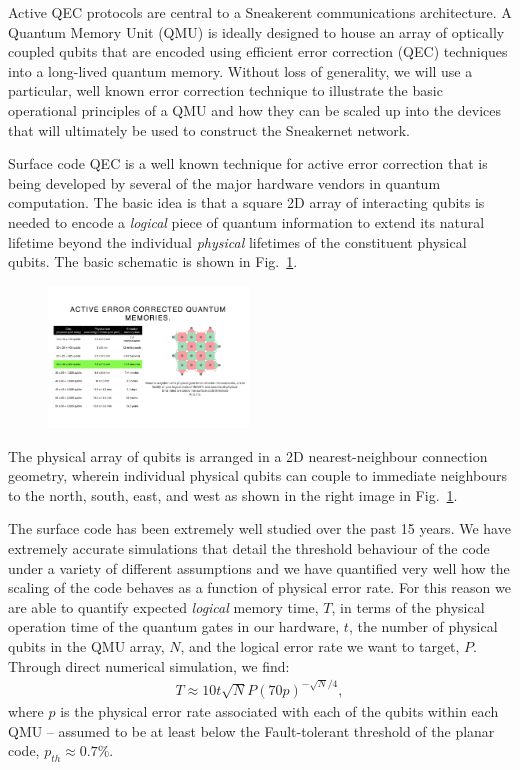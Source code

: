 \documentclass[twocolumn, aps, rmp, amsmath, amssymb, nofootinbib, superscriptaddress, longbibliography, floatfix, table-of-contents, eqsecnum]{revtex4-2}
\begin{document}
Active QEC protocols are central to a Sneakerent communications architecture. A Quantum Memory Unit (QMU) is ideally designed to house an array of optically coupled qubits that are encoded using efficient error correction (QEC) techniques into a long-lived quantum memory. Without loss of generality, we will use a particular, well known error correction technique to illustrate the basic operational principles of a QMU and how they can be scaled up into the devices that will ultimately be used to construct the Sneakernet network.

Surface code QEC is a well known technique for active error correction that is being developed by several of the major hardware vendors in quantum computation. The basic idea is that a square 2D array of interacting qubits is needed to encode a \textit{logical} piece of quantum information to extend its natural lifetime beyond the individual \textit{physical} lifetimes of the constituent physical qubits. The basic schematic is shown in Fig.~\ref{fig:array}. 

\begin{figure}[htbp!]
	\includegraphics[clip=true, width=0.475\textwidth]{array}
	\caption{} \label{fig:array}
\end{figure}

The physical array of qubits is arranged in a 2D nearest-neighbour connection geometry, wherein individual physical qubits can couple to immediate neighbours to the north, south, east, and west as shown in the right image in Fig.~\ref{fig:array}. 

The surface code has been extremely well studied over the past 15 years. We have extremely accurate simulations that detail the threshold behaviour of the code under a variety of different assumptions and we have quantified very well how the scaling of the code behaves as a function of physical error rate. For this reason we are able to quantify expected \textit{logical} memory time, $T$, in terms of the physical operation time of the quantum gates in our hardware, $t$, the number of physical qubits in the QMU array, $N$, and the logical error rate we want to target, $P$. Through direct numerical simulation, we find:
\begin{align} \label{eq:scale}
T \approx 10t\sqrt{N} P(70p)^{-\sqrt{N}/4},
\end{align}
where $p$ is the physical error rate associated with each of the qubits within each QMU -- assumed to be at least below the Fault-tolerant threshold of the planar code, $p_{th} \approx 0.7\%$.
\end{document}
